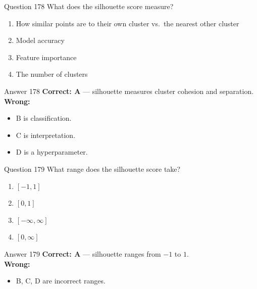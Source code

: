\documentclass[aspectratio=169,11pt]{beamer}
\begin{document}
	\begin{frame}{Question 178}
		What does the silhouette score measure?
		\begin{enumerate}[label=\Alph*.]
			\item How similar points are to their own cluster vs.\ the nearest other cluster
			\item Model accuracy
			\item Feature importance
			\item The number of clusters
		\end{enumerate}
	\end{frame}
	\begin{frame}{Answer 178}
		\textbf{Correct: A} --- silhouette measures cluster cohesion and separation.\\
		\vspace{0.5em}
		\textbf{Wrong:}
		\begin{itemize}
			\item B is classification.
			\item C is interpretation.
			\item D is a hyperparameter.
		\end{itemize}
	\end{frame}
	
	\begin{frame}{Question 179}
		What range does the silhouette score take?
		\begin{enumerate}[label=\Alph*.]
			\item $[-1, 1]$
			\item $[0, 1]$
			\item $[-\infty, \infty]$
			\item $[0, \infty]$
		\end{enumerate}
	\end{frame}
	\begin{frame}{Answer 179}
		\textbf{Correct: A} --- silhouette ranges from $-1$ to $1$.\\
		\vspace{0.5em}
		\textbf{Wrong:}
		\begin{itemize}
			\item B, C, D are incorrect ranges.
		\end{itemize}
	\end{frame}
	
\end{document}
